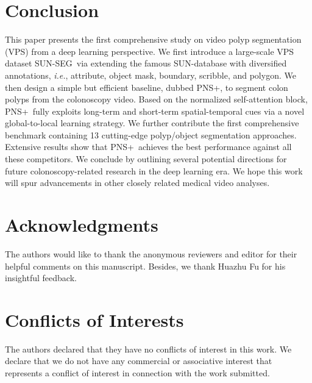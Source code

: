 \documentclass[default,iicol]{sn-jnl}
\theoremstyle{thmstyleone}
\theoremstyle{thmstyletwo}
\theoremstyle{thmstylethree}
\def\ie{\emph{i.e.}}
\def\ourmodel{PNS+}
\def\ourdataset{SUN-SEG}
\begin{document}
\section{Conclusion}
This paper presents the first comprehensive study on video polyp segmentation (VPS) from a deep learning perspective.
We first introduce a large-scale VPS dataset \ourdataset~via extending the famous SUN-database with diversified annotations, \ie, attribute, object mask, boundary, scribble, and polygon.
We then design a simple but efficient baseline, dubbed \ourmodel, to segment colon polyps from the colonoscopy video.
Based on the normalized self-attention block, \ourmodel~fully exploits long-term and short-term spatial-temporal cues via a novel global-to-local learning strategy.
We further contribute the first comprehensive benchmark containing 13 cutting-edge polyp/object segmentation approaches.
Extensive results show that \ourmodel~achieves the best performance against all these competitors.
We conclude by outlining several potential directions for future colonoscopy-related research in the deep learning era.
We hope this work will spur advancements in other closely related medical video analyses.

\section*{Acknowledgments}
The authors would like to thank the anonymous reviewers and editor for their helpful comments on this manuscript.
Besides, we thank Huazhu Fu for his insightful feedback.

\section*{Conflicts of Interests}
The authors declared that they have no conflicts of interest in this work.
We declare that we do not have any commercial or associative interest that represents a conflict of interest in connection with the work submitted.



\end{document}
